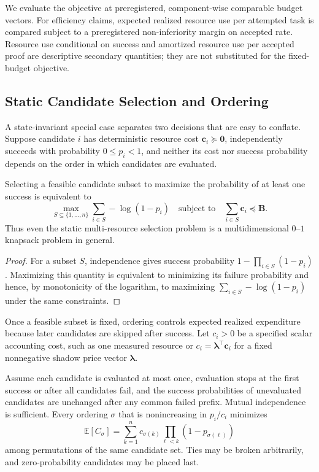 We evaluate the objective at preregistered, component-wise comparable budget
vectors. For efficiency claims, expected realized resource use per attempted
task is compared subject to a preregistered non-inferiority margin on accepted
rate. Resource use conditional on success and amortized resource use per
accepted proof are descriptive secondary quantities; they are not substituted
for the fixed-budget objective.

\subsection{Static Candidate Selection and Ordering}

A state-invariant special case separates two decisions that are easy to
conflate. Suppose candidate \(i\) has deterministic resource cost
\(\mathbf c_i\succeq\mathbf 0\), independently succeeds with probability
\(0\le p_i<1\), and neither its cost nor success probability depends on the
order in which candidates are evaluated.

\begin{proposition}
Selecting a feasible candidate subset to maximize the probability of at least
one success is equivalent to
\[
  \max_{S\subseteq\{1,\ldots,n\}}
  \sum_{i\in S}-\log(1-p_i)
  \quad\text{subject to}\quad
  \sum_{i\in S}\mathbf c_i\preceq\mathbf B.
\]
Thus even the static multi-resource selection problem is a multidimensional
\(0\)--\(1\) knapsack problem in general.
\end{proposition}

\begin{proof}
For a subset \(S\), independence gives success probability
\(1-\prod_{i\in S}(1-p_i)\). Maximizing this quantity is equivalent to
minimizing its failure probability and hence, by monotonicity of the logarithm,
to maximizing \(\sum_{i\in S}-\log(1-p_i)\) under the same constraints.
\end{proof}

Once a feasible subset is fixed, ordering controls expected realized
expenditure because later candidates are skipped after success. Let
\(c_i>0\) be a specified scalar accounting cost, such as one measured resource
or \(c_i=\boldsymbol\lambda^\top\mathbf c_i\) for a fixed nonnegative shadow
price vector \(\boldsymbol\lambda\).

\begin{theorem}
Assume each candidate is evaluated at most once, evaluation stops at the first
success or after all candidates fail, and the success probabilities of
unevaluated candidates are unchanged after any common failed prefix. Mutual
independence is sufficient. Every ordering \(\sigma\) that is nonincreasing in
\(p_i/c_i\) minimizes
\[
  \mathbb E[C_\sigma]
  =
  \sum_{k=1}^{n}c_{\sigma(k)}
  \prod_{\ell<k}(1-p_{\sigma(\ell)})
\]
among permutations of the same candidate set. Ties may be broken arbitrarily,
and zero-probability candidates may be placed last.
\end{theorem}

